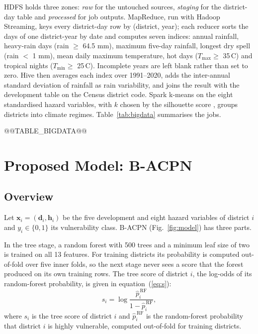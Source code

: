 \documentclass[conference]{IEEEtran}
\begin{document}
HDFS holds three zones: \emph{raw} for the untouched sources, \emph{staging} for the district-day table and \emph{processed} for job outputs. MapReduce, run with Hadoop Streaming, keys every district-day row by (district, year); each reducer sorts the days of one district-year by date and computes seven indices: annual rainfall, heavy-rain days (rain $\ge$ 64.5 mm), maximum five-day rainfall, longest dry spell (rain $<$ 1 mm), mean daily maximum temperature, hot days ($T_{\max} \ge$ 35\,\textdegree C) and tropical nights ($T_{\min} \ge$ 25\,\textdegree C). Incomplete years are left blank rather than set to zero. Hive then averages each index over 1991--2020, adds the inter-annual standard deviation of rainfall as rain variability, and joins the result with the development table on the Census district code. Spark k-means on the eight standardised hazard variables, with $k$ chosen by the silhouette score \cite{rousseeuw1987}, groups districts into climate regimes. Table~\ref{tab:bigdata} summarises the jobs.

@@TABLE_BIGDATA@@

\section{Proposed Model: B-ACPN}
\subsection{Overview}
Let $\mathbf{x}_i = (\mathbf{d}_i, \mathbf{h}_i)$ be the five development and eight hazard variables of district $i$ and $y_i \in \{0,1\}$ its vulnerability class. B-ACPN (Fig.~\ref{fig:model}) has three parts.

In the tree stage, a random forest \cite{breiman2001} with 500 trees and a minimum leaf size of two is trained on all 13 features. For training districts its probability is computed out-of-fold over five inner folds, so the next stage never sees a score that the forest produced on its own training rows. The tree score of district $i$, the log-odds of its random-forest probability, is given in equation~(\ref{eq:s}):
\begin{equation}\label{eq:s}
s_i = \log\frac{\hat p^{\,\text{RF}}_i}{1-\hat p^{\,\text{RF}}_i},
\end{equation}
\noindent where $s_i$ is the tree score of district $i$ and $\hat p^{\,\text{RF}}_i$ is the random-forest probability that district $i$ is highly vulnerable, computed out-of-fold for training districts.
\end{document}
